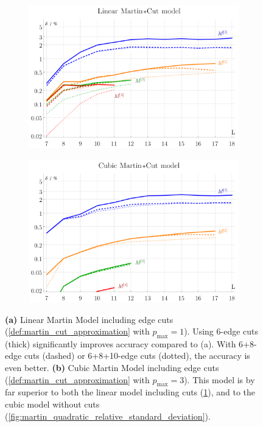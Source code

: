\documentclass[12pt]{article}
\numberwithin{equation}{section}
\begin{document}
\begin{figure}[htb]
	
	\begin{subfigure}{ .49 \linewidth}
		\centering
		\includegraphics[width=\linewidth]{figures/martin_cut_linear}
		\subcaption{}
		\label{fig:martin_cut_linear}
	\end{subfigure}
	\begin{subfigure}{ .49 \linewidth}
		\centering
		\includegraphics[width=\linewidth]{figures/martin_cut_cubic}
		\subcaption{}
		\label{fig:martin_cut_cubic}
	\end{subfigure}
	\caption{ 
	 	\textbf{(a)} Linear Martin Model including edge cuts (\cref{def:martin_cut_approximation} with $p_\text{max}=1$).  Using 6-edge cuts (thick) significantly improves accuracy compared to (a). With 6+8-edge cuts (dashed) or 6+8+10-edge cuts (dotted), the accuracy is even better.
		\textbf{(b)} Cubic Martin Model including edge cuts (\cref{def:martin_cut_approximation} with $p_\text{max}=3$). This model is by far superior to both the linear model including cuts (\cref{fig:martin_cut_linear}), and to the cubic model without cuts (\cref{fig:martin_quadratic_relative_standard_deviation}). }
	\label{fig:martin_cut}
\end{figure}
\end{document}
